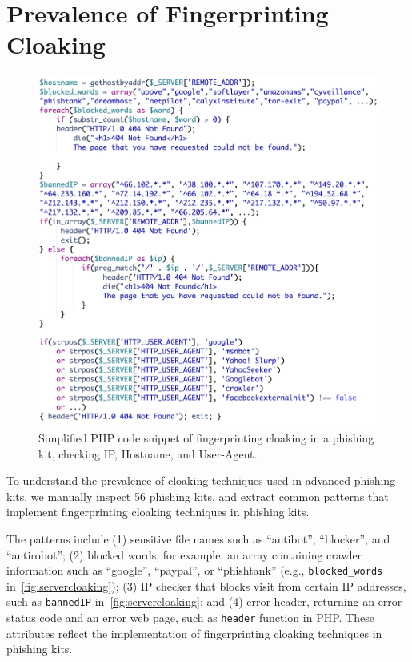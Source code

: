 \section{Prevalence of Fingerprinting Cloaking}
\label{s:prevalence}

\begin{figure}
\centering
\includegraphics[width=\linewidth]{figs/server_cloaking2.png}
\caption{Simplified PHP code snippet of fingerprinting cloaking in a phishing kit, checking IP, Hostname, and User-Agent.}
\label{fig:servercloaking}
\end{figure}

To understand the prevalence of cloaking techniques used in advanced phishing kits, we manually inspect 56 phishing kits, and extract common patterns that implement fingerprinting cloaking techniques in phishing kits.

The patterns include (1) sensitive file names such as ``antibot'', ``blocker'', and ``antirobot''; (2) blocked words, for example, an array containing crawler information such as ``google'', ``paypal'', or ``phishtank'' (e.g., \texttt{blocked\_words} in~\autoref{fig:servercloaking}); (3) IP checker that blocks visit from certain IP addresses, such as \texttt{bannedIP} in~\autoref{fig:servercloaking}; and (4) error header, returning an error status code and an error web page, such as \texttt{header} function in PHP.
These attributes reflect the implementation of fingerprinting cloaking techniques in phishing kits.

